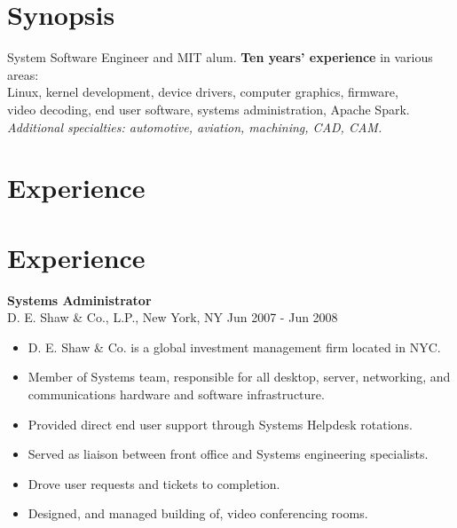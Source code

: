 \documentclass[line,margin]{res}
\begin{document}
\thispagestyle{empty}

\address{1201 West Park Street, Cedar Park, TX 78613-2801}
\address{ \href{mailto:jsoltren@alum.mit.edu}{jsoltren@alum.mit.edu}
   +1 (347) 503-9558
   \url{https://www.linkedin.com/in/jsoltren}}

\begin{resume}

\section{Synopsis}
System Software Engineer and MIT alum. \textbf{Ten years’ experience}
in various areas:\\
Linux, kernel development, device drivers, computer graphics, firmware,\\
video decoding, end user software, systems administration, Apache Spark.\\
\emph{Additional specialties: automotive, aviation, machining, CAD, CAM.}



\section{Experience}







\section{Experience}

\textbf{Systems Administrator} \\
D. E. Shaw \& Co., L.P., New York, NY \hfill Jun 2007 - Jun 2008
\begin{itemize}  \itemsep -2pt %
\item D. E. Shaw \& Co. is a global investment management firm located in NYC.
\item Member of Systems team, responsible for all desktop, server, networking,
      and communications hardware and software infrastructure.
\item Provided direct end user support through Systems Helpdesk rotations.
\item Served as liaison between front office and Systems engineering
      specialists.
\item Drove user requests and tickets to completion.
\item Designed, and managed building of, video conferencing rooms.
\end{itemize}



\end{resume}
\end{document}
